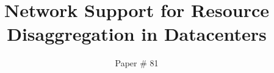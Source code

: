 \documentclass[10pt,twocolumn]{article}
\begin{document}
\title{\bf Network Support for Resource Disaggregation in Datacenters}
\author{Paper \# 81}
\date{}
\maketitle
\thispagestyle{empty}











\end{document}
